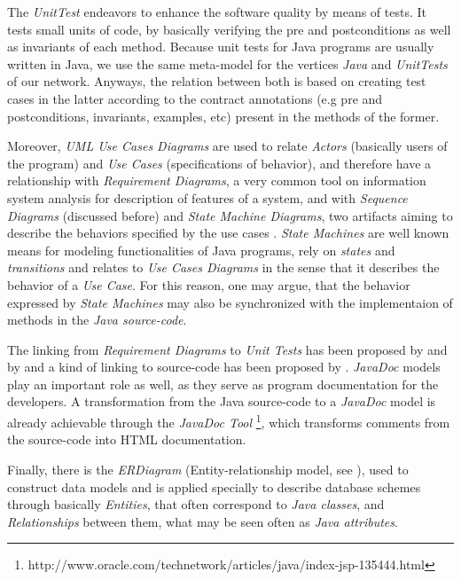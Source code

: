 \documentclass[tuberlin,cic,tc,english,noabntcite]{iiufrgs}
\begin{document}
The \emph{UnitTest} endeavors to enhance the software quality by means of tests. It tests small units of code, by basically verifying the pre and postconditions as well as invariants of each method. Because unit tests for Java programs are usually written in Java, we use the same meta-model for the vertices \emph{Java} and \emph{UnitTests} of our network. Anyways, the relation between both is based on creating test cases in the latter according to the contract annotations (e.g pre and postconditions, invariants, examples, etc) present in the methods of the former.

Moreover, \emph{UML Use Cases Diagrams} are used to relate \emph{Actors} (basically users of the program) and \emph{Use Cases} (specifications of behavior), and therefore have a relationship with \emph{Requirement Diagrams}, a very common tool on information system analysis for description of features of a system, and with \emph{Sequence Diagrams} (discussed before) and \emph{State Machine Diagrams}, two artifacts aiming to describe the behaviors specified by the use cases \citep[p. 637]{omg2007unified}. \emph{State Machines} are well known means for modeling functionalities of Java programs, rely on \emph{states} and \emph{transitions} and relates to \emph{Use Cases Diagrams} in the sense that it describes the behavior of a \emph{Use Case}. For this reason, one may argue, that the behavior expressed by \emph{State Machines} may also be synchronized with the implementaion of methods in the \emph{Java source-code}.

The linking from \emph{Requirement Diagrams} to \emph{Unit Tests} has been proposed by \citet{noack2013automatic} and by \citet{post2009linking} and a kind of linking to source-code has been proposed by \citet{antoniol2002recovering}. \emph{JavaDoc} models play an important role as well, as they serve as program documentation for the developers. A transformation from the Java source-code to a \emph{JavaDoc} model is already achievable through the \emph{JavaDoc Tool} \footnote{http://www.oracle.com/technetwork/articles/java/index-jsp-135444.html}, which transforms comments from the source-code into HTML documentation.

Finally, there is the \emph{ERDiagram} (Entity-relationship model, see \citep{chen1976entity}), used to construct data models and is applied specially to describe database schemes through basically \emph{Entities}, that often correspond to \emph{Java classes}, and \emph{Relationships} between them, what may be seen often as \emph{Java attributes}.
\end{document}
